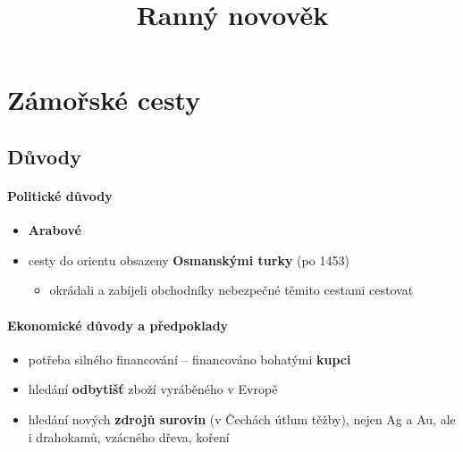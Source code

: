 \title{Ranný novověk}


\section{Zámořské cesty}
\subsection{Důvody}
\paragraph{Politické důvody}
\begin{itemize}
\item \textbf{Arabové}
\item cesty do orientu obsazeny \textbf{Osmanskými turky} (po 1453)
	\begin{itemize}
	\item okrádali a zabíjeli obchodníky \ra nebezpečné těmito cestami cestovat
	\end{itemize}
\end{itemize}

\paragraph{Ekonomické důvody a předpoklady}
\begin{itemize}
\item potřeba silného financování -- financováno bohatými \textbf{kupci}
\item hledání \textbf{odbytišť} zboží vyráběného v Evropě
\item hledání nových \textbf{zdrojů surovin} (v Čechách útlum těžby), nejen Ag a Au, ale i drahokamů, vzácného dřeva, koření
\end{itemize}

